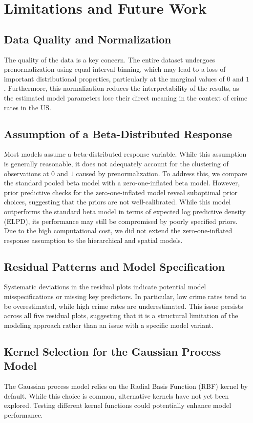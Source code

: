 \documentclass[12pt]{article}
\begin{document}
\section{Limitations and Future Work}

\subsection{Data Quality and Normalization}  
The quality of the data is a key concern. The entire dataset undergoes prenormalization using equal-interval binning, which may lead to a loss of important distributional properties, particularly at the marginal values of \(0\) and \(1\). Furthermore, this normalization reduces the interpretability of the results, as the estimated model parameters lose their direct meaning in the context of crime rates in the US.  

\subsection{Assumption of a Beta-Distributed Response}  
Most models assume a beta-distributed response variable. While this assumption is generally reasonable, it does not adequately account for the clustering of observations at \(0\) and \(1\) caused by prenormalization. To address this, we compare the standard pooled beta model with a zero-one-inflated beta model. However, prior predictive checks for the zero-one-inflated model reveal suboptimal prior choices, suggesting that the priors are not well-calibrated. While this model outperforms the standard beta model in terms of expected log predictive density (ELPD), its performance may still be compromised by poorly specified priors. Due to the high computational cost, we did not extend the zero-one-inflated response assumption to the hierarchical and spatial models.  

\subsection{Residual Patterns and Model Specification}  
Systematic deviations in the residual plots indicate potential model misspecifications or missing key predictors. In particular, low crime rates tend to be overestimated, while high crime rates are underestimated. This issue persists across all five residual plots, suggesting that it is a structural limitation of the modeling approach rather than an issue with a specific model variant.  

\subsection{Kernel Selection for the Gaussian Process Model}  
The Gaussian process model relies on the Radial Basis Function (RBF) kernel by default. While this choice is common, alternative kernels have not yet been explored. Testing different kernel functions could potentially enhance model performance.  
\end{document}
